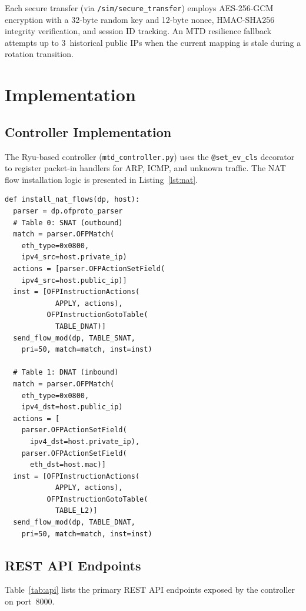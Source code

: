 \documentclass[conference]{IEEEtran}
\begin{document}
Each secure transfer (via \texttt{/sim/secure\_transfer}) employs AES-256-GCM encryption with a 32-byte random key and 12-byte nonce, HMAC-SHA256 integrity verification, and session ID tracking. An MTD resilience fallback attempts up to 3~historical public IPs when the current mapping is stale during a rotation transition.

\section{Implementation}

\subsection{Controller Implementation}

The Ryu-based controller (\texttt{mtd\_controller.py}) uses the \texttt{@set\_ev\_cls} decorator to register packet-in handlers for ARP, ICMP, and unknown traffic. The NAT flow installation logic is presented in Listing~\ref{lst:nat}.

\begin{lstlisting}[caption={NAT Flow Installation Pseudocode},label=lst:nat,float=htbp]
def install_nat_flows(dp, host):
  parser = dp.ofproto_parser
  # Table 0: SNAT (outbound)
  match = parser.OFPMatch(
    eth_type=0x0800,
    ipv4_src=host.private_ip)
  actions = [parser.OFPActionSetField(
    ipv4_src=host.public_ip)]
  inst = [OFPInstructionActions(
            APPLY, actions),
          OFPInstructionGotoTable(
            TABLE_DNAT)]
  send_flow_mod(dp, TABLE_SNAT,
    pri=50, match=match, inst=inst)

  # Table 1: DNAT (inbound)
  match = parser.OFPMatch(
    eth_type=0x0800,
    ipv4_dst=host.public_ip)
  actions = [
    parser.OFPActionSetField(
      ipv4_dst=host.private_ip),
    parser.OFPActionSetField(
      eth_dst=host.mac)]
  inst = [OFPInstructionActions(
            APPLY, actions),
          OFPInstructionGotoTable(
            TABLE_L2)]
  send_flow_mod(dp, TABLE_DNAT,
    pri=50, match=match, inst=inst)
\end{lstlisting}

\subsection{REST API Endpoints}

Table~\ref{tab:api} lists the primary REST API endpoints exposed by the controller on port~8000.
\end{document}

